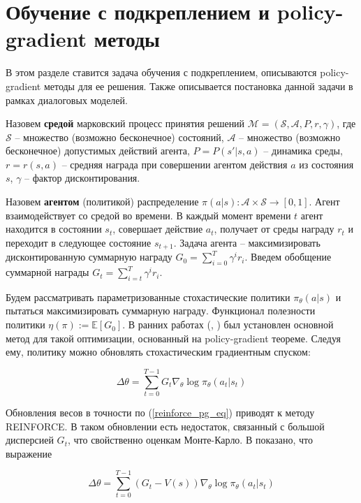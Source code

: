 \documentclass[]{article}
\begin{document}
\section{Обучение с подкреплением и policy-gradient методы}

В этом разделе ставится задача обучения с подкреплением, описываются policy-gradient методы для ее решения. Также описывается постановка данной задачи в рамках диалоговых моделей.

Назовем \textbf{средой} марковский процесс принятия решений $\mathcal{M} = (\mathcal{S}, \mathcal{A}, P, r, \gamma)$, где $\mathcal{S}$ -- множество (возможно бесконечное) состояний, $\mathcal{A}$ -- множество (возможно бесконечное) допустимых действий агента, $P = P(s' | s,a)$ -- динамика среды, $r = r(s, a)$ -- средняя награда при совершении агентом действия $a$ из состояния $s$, $\gamma$ -- фактор дисконтирования.

Назовем \textbf{агентом} (политикой) распределение $\pi(a|s) : \mathcal{A} \times \mathcal{S} \rightarrow [0, 1]$. Агент взаимодействует со средой во времени. В каждый момент времени $t$ агент находится в состоянии $s_t$, совершает действие $a_t$, получает от среды награду $r_t$ и переходит в следующее состояние $s_{t+1}$. Задача агента -- максимизировать дисконтированную суммарную награду $G_0 = \sum_{i=0}^{T}\gamma^i r_i$. Введем обобщение суммарной награды $G_t = \sum_{i=t}^{T}\gamma^i r_i$.

Будем рассматривать параметризованные стохастические политики $\pi_{\theta}(a|s)$ и пытаться максимизировать суммарную награду. Функционал полезности политики $\eta(\pi) := \mathbb{E}[G_0]$. В ранних работах (\cite{sutton1998reinforcement}, \cite{sutton1999policy}) был установлен основной метод для такой оптимизации, основанный на policy-gradient теореме. Следуя ему, политику можно обновлять стохастическим градиентным спуском:

\begin{equation}
\label{reinforce_pg_eq}
\Delta \theta = \sum_{t=0}^{T-1}G_t \nabla_\theta\log\pi_{\theta}(a_t|s_t)
\end{equation}

Обновления весов в точности по (\ref{reinforce_pg_eq}) приводят к методу REINFORCE. В таком обновлении есть недостаток, связанный с большой дисперсией $G_t$, что свойственно оценкам Монте-Карло. В \cite{sutton1999policy} показано, что выражение

\begin{equation}
\label{a2c_pg_eq}
\Delta \theta = \sum_{t=0}^{T-1}(G_t - V(s)) \nabla_\theta\log\pi_{\theta}(a_t|s_t)
\end{equation}
\end{document}
